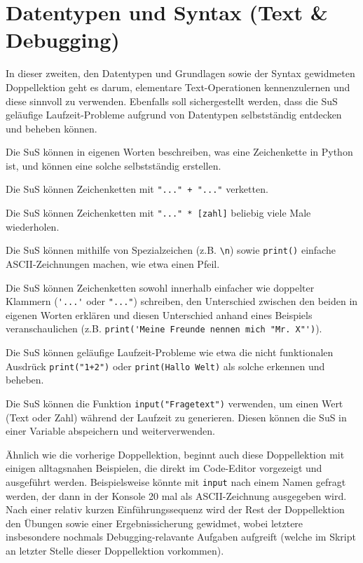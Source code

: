 \section{Datentypen und Syntax (Text \& Debugging)}
\begin{myExBox}
	In dieser zweiten, den Datentypen und Grundlagen sowie der Syntax gewidmeten Doppellektion geht es darum, elementare Text-Operationen kennenzulernen und diese sinnvoll zu verwenden. Ebenfalls soll sichergestellt werden, dass die SuS geläufige Laufzeit-Probleme aufgrund von Datentypen selbstständig entdecken und beheben können.


	\begin{todolist}
		\item Die SuS können in eigenen Worten beschreiben, was eine Zeichenkette in Python ist, und können eine solche selbstständig erstellen.
		\item Die SuS können Zeichenketten mit \lstinline|"..." + "..."| verketten.
		\item Die SuS können Zeichenketten mit \lstinline|"..." * [zahl]| beliebig viele Male wiederholen.
		\item Die SuS können mithilfe von Spezialzeichen (z.B. \lstinline|\n|) sowie \lstinline|print()| einfache ASCII-Zeichnungen machen, wie etwa einen Pfeil.
		\item Die SuS können Zeichenketten sowohl innerhalb einfacher wie doppelter Klammern (\lstinline|'...'| oder \lstinline|"..."|) schreiben, den Unterschied zwischen den beiden in eigenen Worten erklären und diesen Unterschied anhand eines Beispiels veranschaulichen (z.B. \lstinline|print('Meine Freunde nennen mich "Mr. X"')|).
		\item Die SuS können geläufige Laufzeit-Probleme wie etwa die nicht funktionalen Ausdrück \lstinline|print("1+2")| oder \lstinline|print(Hallo Welt)| als solche erkennen und beheben.
		\item Die SuS können die Funktion \lstinline|input("Fragetext")| verwenden, um einen Wert (Text oder Zahl) während der Laufzeit zu generieren. Diesen können die SuS in einer Variable abspeichern und weiterverwenden.
	\end{todolist}


	Ähnlich wie die vorherige Doppellektion, beginnt auch diese Doppellektion mit einigen alltagsnahen Beispielen, die direkt im Code-Editor vorgezeigt und ausgeführt werden. Beispielsweise könnte mit \lstinline|input| nach einem Namen gefragt werden, der dann in der Konsole 20 mal als ASCII-Zeichnung ausgegeben wird. Nach einer relativ kurzen Einführungssequenz wird der Rest der Doppellektion den Übungen sowie einer Ergebnissicherung gewidmet, wobei letztere insbesondere nochmals Debugging-relavante Aufgaben aufgreift (welche im Skript an letzter Stelle dieser Doppellektion vorkommen).


\end{myExBox}
